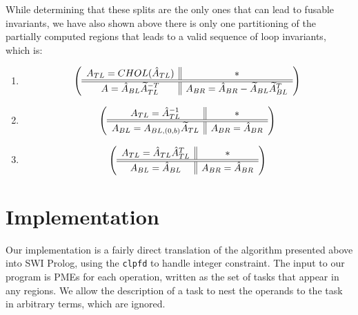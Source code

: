 \documentclass[12pt,letterpaper]{article}
\newcommand*{\opF}{\mathcal{F}}
\begin{document}
While determining that these splits are the only ones that can lead to fusable invariants, we have also shown above there is only one partitioning of the partially computed regions that leads to a valid sequence of loop invariants, which is:
\begin{enumerate}
\item
  \begin{equation*}
  \left( \begin{array}{c || c} A_{TL}  = CHOL(\hat{A}_{TL}) & * \\ \hline \hline A = \hat{A}_{BL}\widetilde{A}_{TL}^{-T} & A_{BR} = \hat{A}_{BR} - \widetilde{A}_{BL}\widetilde{A}_{BL}^T \end{array} \right)
  \end{equation*}
\item
  \begin{equation*}
    \left( \begin{array}{c || c} A_{TL} = \hat{A}_{TL}^{-1} & * \\ \hline \hline A_{BL} = A_{BL, (0, b)}\widetilde{A}_{TL} & A_{BR} =  \hat{A}_{BR} \end{array} \right)
  \end{equation*}
\item
  \begin{equation*}
    \left( \begin{array}{c || c} A_{TL} = \hat{A}_{TL}\hat{A}_{TL}^T & * \\ \hline \hline A_{BL} = \hat{A}_{BL} & A_{BR} = \hat{A}_{BR} \end{array} \right)
  \end{equation*}
\end{enumerate}

\section{Implementation}
Our implementation is a fairly direct translation of the algorithm presented above into SWI Prolog, using the \texttt{clpfd} to handle integer constraint.
The input to our program is PMEs for each operation, written as the set of tasks that appear in any regions.
We allow the description of a task to nest the operands to the task in arbitrary terms, which are ignored.


\end{document}
